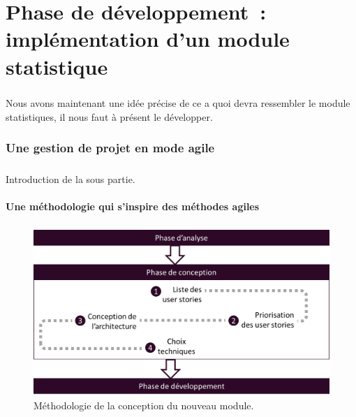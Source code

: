 \chapter{Phase de développement~: implémentation d'un module statistique}
	\paragraph{}
	Nous avons maintenant une idée précise de ce a quoi devra ressembler le module
	statistiques, il nous faut à présent le développer.
	
	\subsection{Une gestion de projet en mode agile}
		\paragraph{}
		Introduction de la sous partie.
		
		\subsubsection{Une méthodologie qui s'inspire des méthodes agiles}
			\paragraph{}
			
			\begin{figure}[h]%
				\centering
				\includegraphics[width=15cm]{../img/part3/methodo_conception.png}
				\caption{\label{methodo_conception} Méthodologie de la conception du
				nouveau module.}
			\end{figure}
			

